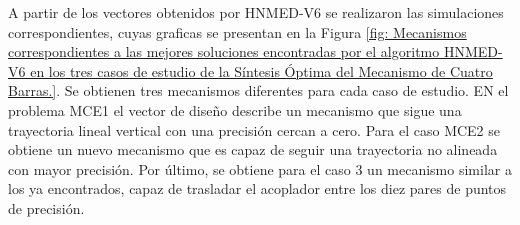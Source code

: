 A partir de los vectores obtenidos por HNMED-V6 se realizaron las simulaciones correspondientes, cuyas graficas se presentan en la Figura \ref{fig: Mecanismos correspondientes a las mejores soluciones encontradas por el algoritmo HNMED-V6 en los
	tres casos de estudio de la Síntesis Óptima del Mecanismo de Cuatro Barras.}. Se obtienen tres mecanismos diferentes para cada caso de estudio. EN el problema MCE1 el vector de diseño describe un mecanismo que sigue una trayectoria lineal vertical con una precisión cercan a cero.  Para el caso MCE2 se obtiene un nuevo mecanismo que es capaz de seguir una trayectoria no alineada con mayor precisión. Por último,  se obtiene para el caso 3 un mecanismo similar a los ya encontrados, capaz de trasladar el acoplador entre los diez pares de puntos de precisión.

\begin{table}
	\centering
	\caption{Vectores de diseño obtenidos por HNMED-V6 y C-LSHADE para los tres casos de estudio del mecanismo de cuatro barras, correspondientes al la mejor observación de la muestra.}
	\label{tab:Vectores de diseño por HNMED-V6 y C-LSHADE para los tres casos de estudio del mecanismo de cuatro barras, correspondientes al la mejor observación de la muestra.}
\end{table}
